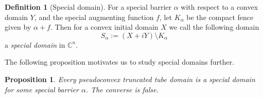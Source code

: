 \documentclass[12pt,reqno, a4paper]{amsart}
\newtheorem{proposition}[theorem]{Proposition}
\theoremstyle{definition}
\theoremstyle{definition}
\newtheorem{definition}[theorem]{Definition}
\numberwithin{equation}{section}
\def\C{\mathbb{C}}                              %
\begin{document}
 
\begin{definition}[Special domain]\label{special_domain}
For a special barrier $\alpha$ with respect to a convex domain $Y$, and the special augmenting function $f$, let $K_{\alpha}$ be the compact fence given by $\alpha+f$.  Then for a convex initial domain $X$ we call the following domain
	\begin{equation}\label{salpha}
		S_{\alpha}:=(X+iY)\setminus K_{\alpha}
	\end{equation}
a \textit{special domain} in $\C^n.$ 
\end{definition}
The following proposition motivates us to study special domains further.
\begin{proposition}
Every pseudoconvex truncated tube domain is a special domain for some special barrier $\alpha$. The converse is false.
\end{proposition}
\end{document}
